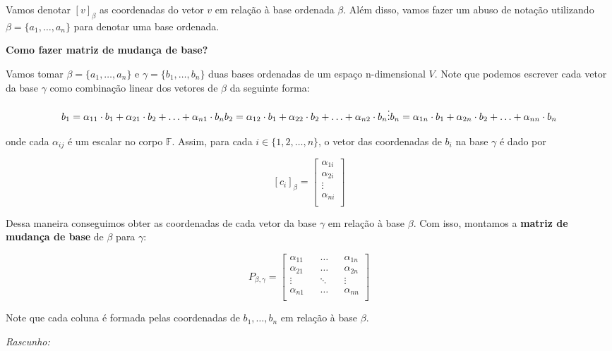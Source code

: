 \documentclass[
]{article}
\begin{document}
Vamos denotar \([ v ]_\beta\) as coordenadas do vetor \(v\) em relação à
base ordenada \(\beta\). Além disso, vamos fazer um abuso de notação
utilizando \(\beta = \{ a_1, \ldots, a_n \}\) para denotar uma base
ordenada.

\textbf{Como fazer matriz de mudança de base?}

Vamos tomar \(\beta = \{ a_1, \ldots, a_n \}\) e
\(\gamma = \{ b_1, \ldots, b_n \}\) duas bases ordenadas de um espaço
n-dimensional \(V\). Note que podemos escrever cada vetor da base
\(\gamma\) como combinação linear dos vetores de \(\beta\) da seguinte
forma:

\[b_1 = \alpha_{11}\cdot b_1 + \alpha_{21}\cdot b_2 + \ldots + \alpha_{n1}\cdot b_n\\
b_2 = \alpha_{12}\cdot b_1 + \alpha_{22}\cdot b_2 + \ldots + \alpha_{n2}\cdot b_n\\
\vdots \\
b_n = \alpha_{1n}\cdot b_1 + \alpha_{2n}\cdot b_2 + \ldots + \alpha_{nn}\cdot b_n\\\]

onde cada \(\alpha_{ij}\) é um escalar no corpo \(\mathbb{F}\). Assim,
para cada \(i \in \{1, 2, \ldots, n \}\), o vetor das coordenadas de
\(b_i\) na base \(\gamma\) é dado por

\[[c_i]_\beta =
\begin{bmatrix} 
\alpha_{1i} \\
\alpha_{2i} \\
\vdots \\
\alpha_{ni} \\
\end{bmatrix}\]

Dessa maneira conseguimos obter as coordenadas de cada vetor da base
\(\gamma\) em relação à base \(\beta\). Com isso, montamos a
\textbf{matriz de mudança de base} de \(\beta\) para \(\gamma\):

\[P_{\beta,\gamma} =
\begin{bmatrix} 
\alpha_{11} && \ldots && \alpha_{1n} \\
\alpha_{21} && \ldots && \alpha_{2n} \\
\vdots && \ddots && \vdots \\
\alpha_{n1} && \ldots && \alpha_{nn} \\
\end{bmatrix}\]

Note que cada coluna é formada pelas coordenadas de \(b_1, \ldots, b_n\)
em relação à base \(\beta\).

\emph{Rascunho:}
\end{document}
